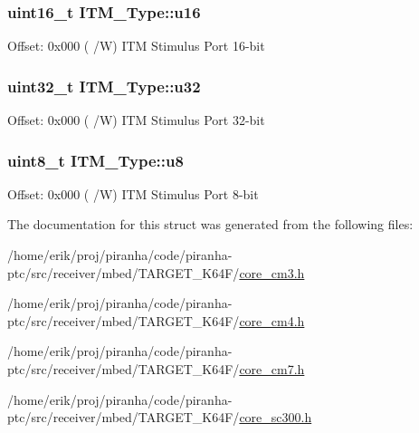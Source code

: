 \subsubsection[{\texorpdfstring{u16}{u16}}]{ uint16\+\_\+t I\+T\+M\+\_\+\+Type\+::u16}\hypertarget{structITM__Type_a12aa4eb4d9dcb589a5d953c836f4e8f4}{}\label{structITM__Type_a12aa4eb4d9dcb589a5d953c836f4e8f4}
Offset\+: 0x000 ( /W) I\+TM Stimulus Port 16-\/bit 
\subsubsection[{\texorpdfstring{u32}{u32}}]{ uint32\+\_\+t I\+T\+M\+\_\+\+Type\+::u32}\hypertarget{structITM__Type_a6882fa5af67ef5c5dfb433b3b68939df}{}\label{structITM__Type_a6882fa5af67ef5c5dfb433b3b68939df}
Offset\+: 0x000 ( /W) I\+TM Stimulus Port 32-\/bit 
\subsubsection[{\texorpdfstring{u8}{u8}}]{ uint8\+\_\+t I\+T\+M\+\_\+\+Type\+::u8}\hypertarget{structITM__Type_abea77b06775d325e5f6f46203f582433}{}\label{structITM__Type_abea77b06775d325e5f6f46203f582433}
Offset\+: 0x000 ( /W) I\+TM Stimulus Port 8-\/bit 

The documentation for this struct was generated from the following files\+:\begin{DoxyCompactItemize}
\item 
/home/erik/proj/piranha/code/piranha-\/ptc/src/receiver/mbed/\+T\+A\+R\+G\+E\+T\+\_\+\+K64\+F/\hyperlink{core__cm3_8h}{core\+\_\+cm3.\+h}\item 
/home/erik/proj/piranha/code/piranha-\/ptc/src/receiver/mbed/\+T\+A\+R\+G\+E\+T\+\_\+\+K64\+F/\hyperlink{core__cm4_8h}{core\+\_\+cm4.\+h}\item 
/home/erik/proj/piranha/code/piranha-\/ptc/src/receiver/mbed/\+T\+A\+R\+G\+E\+T\+\_\+\+K64\+F/\hyperlink{core__cm7_8h}{core\+\_\+cm7.\+h}\item 
/home/erik/proj/piranha/code/piranha-\/ptc/src/receiver/mbed/\+T\+A\+R\+G\+E\+T\+\_\+\+K64\+F/\hyperlink{core__sc300_8h}{core\+\_\+sc300.\+h}\end{DoxyCompactItemize}
